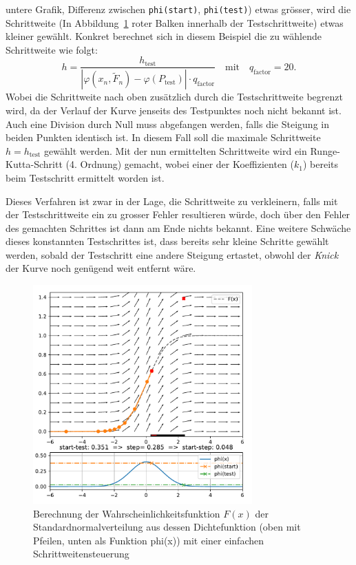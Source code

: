 untere Grafik, Differenz zwischen \texttt{phi(start)}, \texttt{phi(test)}) etwas grösser,
wird die Schrittweite (In Abbildung~\ref{buch:steps:examplessc} roter Balken innerhalb der Testschrittweite) etwas kleiner gewählt.
Konkret berechnet sich in diesem Beispiel die zu wählende Schrittweite wie folgt:
\[
  h=\frac{h_{\text{test}}}{|\varphi(x_n, \tilde{F}_n)-\varphi(P_{\text{test}})|\cdot q_{\text{factor}}}\quad \text{mit} \quad q_{\text{factor}}=20.
\]
Wobei die Schrittweite nach oben zusätzlich durch die Testschrittweite begrenzt wird,
da der Verlauf der Kurve jenseits des Testpunktes noch nicht bekannt ist.
Auch eine Division durch Null muss abgefangen werden, falls die Steigung in beiden Punkten identisch ist.
In diesem Fall soll die maximale Schrittweite $h=h_{\text{test}}$ gewählt werden.
Mit der nun ermittelten Schrittweite wird ein Runge-Kutta-Schritt (4. Ordnung) gemacht,
wobei einer der Koeffizienten ($k_1$) bereits beim Testschritt ermittelt worden ist.

Dieses Verfahren ist zwar in der Lage, die Schrittweite zu verkleinern, falls mit der Testschrittweite ein zu grosser Fehler resultieren würde,
doch über den Fehler des gemachten Schrittes ist dann am Ende nichts bekannt.
Eine weitere Schwäche dieses konstannten Testschrittes ist, dass bereits sehr kleine Schritte gewählt werden,
sobald der Testschritt eine andere Steigung ertastet, obwohl der \textit{Knick} der Kurve noch genügend weit entfernt wäre.

\begin{figure}
  \centering
  \includegraphics[width=0.75\textwidth]{papers/steps/img/ssc.pdf}
  \caption{Berechnung der Wahrscheinlichkeitsfunktion $F(x)$ der Standardnormalverteilung aus dessen Dichtefunktion
    (oben mit Pfeilen, unten als Funktion phi(x)) mit einer einfachen Schrittweitensteuerung
    \label{buch:steps:examplessc}}
\end{figure}

